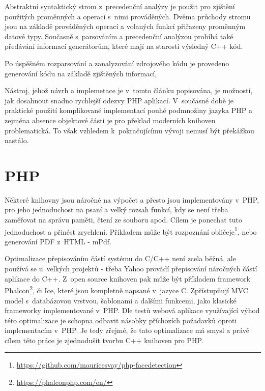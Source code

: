 \documentclass[czech]{ExcelAtFIT}
\begin{document}

		Abstraktní syntaktický strom z~precedenční a\-na\-lý\-zy je použit pro zjištění použitých proměnných a operací s~nimi prováděných. Dvěma průchody stromu jsou na základě prováděných operací a volaných funkcí přiřazeny proměnným datové typy. Současně s~par\-so\-vá\-ním a precedenční analýzou probíhá také předávání informací generátorům, které mají na starosti výsledný C++ kód.

		Po úspěšném rozparsování a zanalyzování zdrojového kódu je provedeno generování kódu na základě zjištěných informací,


		Nástroj, jehož návrh a implemetace je v~tomto článku popisována, je možností, jak dosahnout snadno rychlejší odezvy PHP aplikací. V~současné době je praktické použití komplikované implementací pouhé podmnožiny jazyka PHP a zejména absence objektové části je pro překlad moderních knihoven problematická. To však vzhledem k~pokračujícímu vývoji nemusí být překážkou nastálo.






\section{PHP}

	Některé knihovny jsou náročné na výpočet a přesto jsou implementovány v~PHP, pro jeho jednoduchost na psaní a velký rozsah funkcí, kdy se není třeba zaměřovat na správu paměti, čtení ze souboru apod. Cílem je ponechat tuto jednoduchost a přinést zrychlení. Pří\-kla\-dem může být rozpoznání obličeje\footnote{\url{https://github.com/mauricesvay/php-facedetection}}, nebo generování PDF z~HTML - mPdf.

	Optimalizace přepisováním částí systému do C/C++ není zcela běžná, ale používá se u~velkých projektů - třeba Yahoo provádí přepisování náročných částí aplikace do C++\cite{yahooCpp}. Z~open source knihoven pak může být příkladem framework Phalcon\footnote{\url{https://phalconphp.com/en/}}, či Ice, které jsou kompletně napsané v~jazyce C. Zpřístupňují MVC model s~databázovou vrstvou, šablonami a dalšími funkcemi, jako klasické frameworky implementované v~PHP. Dle testů\cite{phalconBenchmark} webová aplikace využívající výhod této optimalizace je schopna odbavit násobky pří\-cho\-zích požadavků oproti implementacím v~PHP. Je tedy zřejmé, že tato optimalizace má smysl a právě cílem této práce je zjednodušit tvorbu C++ knihoven pro PHP.
\end{document}
